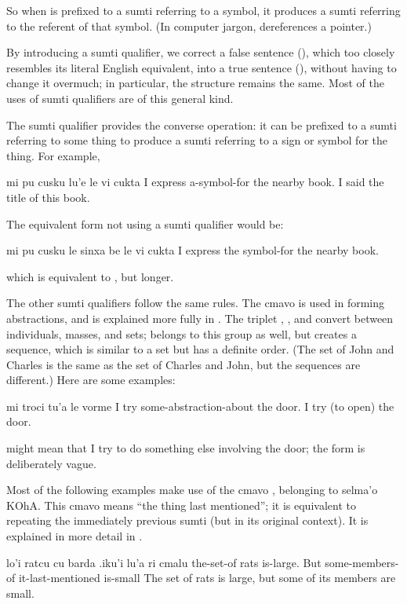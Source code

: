 So when  is prefixed to a sumti referring to a symbol,
    it produces a sumti referring to the referent of that symbol.
    (In computer jargon,  dereferences a pointer.) 

By introducing a sumti qualifier, we correct a false
    sentence (), which too closely
    resembles its literal English equivalent, into a true sentence
    (), without having to change
    it overmuch; in particular, the structure remains the same.
    Most of the uses of sumti qualifiers are of this general
    kind.

The sumti qualifier  provides the converse
    operation: it can be prefixed to a sumti referring to some
    thing to produce a sumti referring to a sign or symbol for the
    thing. For example,
\begin{example}
mi pu cusku lu'e le vi cukta\n
I  express a-symbol-for the nearby book.\n
I said the title of this book.
\end{example}

The equivalent form not using a sumti qualifier would
    be:
\begin{example}
mi pu cusku le sinxa be le vi cukta\n
I  express the symbol-for the nearby book.
\end{example}

{\noindent}which is equivalent to , but
    longer. 

The other sumti qualifiers follow the same rules. The cmavo
     is used in forming abstractions, and is explained more
    fully in . The triplet
    , , and  convert between individuals,
    masses, and sets;  belongs to this group as well, but
    creates a sequence, which is similar to a set but has a
    definite order. (The set of John and Charles is the same as the
    set of Charles and John, but the sequences are different.) Here
    are some examples:
\begin{example}
mi troci tu'a le vorme\n
I try some-abstraction-about the door.\n
I try (to open) the door.
\end{example}

 might mean that I try to do
    something else involving the door; the form is deliberately
    vague. 

Most of the following examples make use of the cmavo ,
    belonging to selma'o KOhA. This cmavo means ``the thing last
    mentioned''; it is equivalent to repeating the immediately
    previous sumti (but in its original context). It is explained
    in more detail in .
\begin{example}
lo'i ratcu cu barda\n
\T	.iku'i lu'a ri cmalu\n
the-set-of rats is-large.\n
\T	But some-members-of it-last-mentioned is-small\n
The set of rats is large,\n
\T	but some of its members are small.
\end{example}

